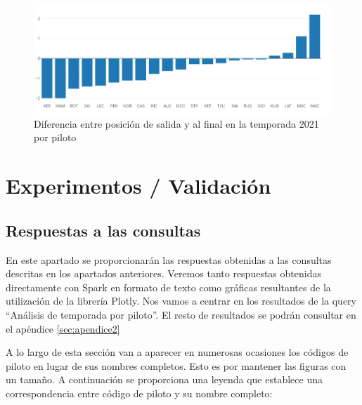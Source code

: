 \documentclass[12pt,twoside,titlepage]{report}
\newcommand{\quotes}[1]{``#1''}
\begin{document}
\begin{figure}[H]
	\includegraphics[scale=0.4]{results/seasonanalysis/positionDelta.png}
	\centering
	\caption{Diferencia entre posición de salida y al final en la temporada 2021 por piloto}
	\label{fig:positionDelta}
	\centering
\end{figure}


\chapter{Experimentos / Validación}
\label{sec:expVal}
\newpage


\section{Respuestas a las consultas}

En este apartado se proporcionarán las respuestas obtenidas a las consultas descritas en los apartados anteriores. Veremos tanto respuestas obtenidas directamente con Spark en formato de texto como gráficas resultantes de la utilización de la librería Plotly. Nos vamos a centrar en los resultados de la query \quotes{Análisis de temporada por piloto}. El resto de resultados se podrán consultar en el apéndice \ref{sec:apendice2}

A lo largo de esta sección van a aparecer en numerosas ocasiones los códigos de piloto en lugar de sus nombres completos. Esto es por mantener las figuras con un tamaño. A continuación se proporciona una leyenda que establece una correspondencia entre código de piloto y su nombre completo:
\end{document}

